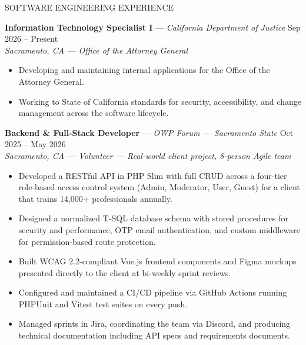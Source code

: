 \documentclass{resume}
\begin{document}
\begin{rSection}{SOFTWARE ENGINEERING EXPERIENCE}

\textbf{Information Technology Specialist I} --- \textit{California Department of Justice} \hfill Sep 2026 -- Present \\
\textit{Sacramento, CA --- Office of the Attorney General}
\begin{itemize}
    \item Developing and maintaining internal applications for the Office of the Attorney General.
    \item Working to State of California standards for security, accessibility, and change management across the software lifecycle.
\end{itemize}

\textbf{Backend \& Full-Stack Developer} --- \textit{OWP Forum --- Sacramento State} \hfill Oct 2025 -- May 2026 \\
\textit{Sacramento, CA --- Volunteer --- Real-world client project, 8-person Agile team}
\begin{itemize}
    \item Developed a RESTful API in PHP Slim with full CRUD across a four-tier role-based access control system (Admin, Moderator, User, Guest) for a client that trains 14,000+ professionals annually.
    \item Designed a normalized T-SQL database schema with stored procedures for security and performance, OTP email authentication, and custom middleware for permission-based route protection.
    \item Built WCAG 2.2-compliant Vue.js frontend components and Figma mockups presented directly to the client at bi-weekly sprint reviews.
    \item Configured and maintained a CI/CD pipeline via GitHub Actions running PHPUnit and Vitest test suites on every push.
    \item Managed sprints in Jira, coordinating the team via Discord, and producing technical documentation including API specs and requirements documents.
\end{itemize}


\end{rSection}
\end{document}
